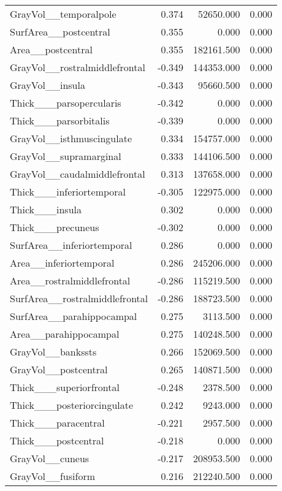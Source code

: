\documentclass{article}
\begin{document}
\begin{table}
\begin{tabular}{lrrr}
	GrayVol\_\_temporalpole & 0.374 & 52650.000 & 0.000 \\
	SurfArea\_\_postcentral & 0.355 & 0.000 & 0.000 \\
	Area\_\_postcentral & 0.355 & 182161.500 & 0.000 \\
	GrayVol\_\_rostralmiddlefrontal & -0.349 & 144353.000 & 0.000 \\
	GrayVol\_\_insula & -0.343 & 95660.500 & 0.000 \\
	Thick\_\_\_parsopercularis & -0.342 & 0.000 & 0.000 \\
	Thick\_\_\_parsorbitalis & -0.339 & 0.000 & 0.000 \\
	GrayVol\_\_isthmuscingulate & 0.334 & 154757.000 & 0.000 \\
	GrayVol\_\_supramarginal & 0.333 & 144106.500 & 0.000 \\
	GrayVol\_\_caudalmiddlefrontal & 0.313 & 137658.000 & 0.000 \\
	Thick\_\_\_inferiortemporal & -0.305 & 122975.000 & 0.000 \\
	Thick\_\_\_insula & 0.302 & 0.000 & 0.000 \\
	Thick\_\_\_precuneus & -0.302 & 0.000 & 0.000 \\
	SurfArea\_\_inferiortemporal & 0.286 & 0.000 & 0.000 \\
	Area\_\_inferiortemporal & 0.286 & 245206.000 & 0.000 \\
	Area\_\_rostralmiddlefrontal & -0.286 & 115219.500 & 0.000 \\
	SurfArea\_\_rostralmiddlefrontal & -0.286 & 188723.500 & 0.000 \\
	SurfArea\_\_parahippocampal & 0.275 & 3113.500 & 0.000 \\
	Area\_\_parahippocampal & 0.275 & 140248.500 & 0.000 \\
	GrayVol\_\_bankssts & 0.266 & 152069.500 & 0.000 \\
	GrayVol\_\_postcentral & 0.265 & 140871.500 & 0.000 \\
	Thick\_\_\_superiorfrontal & -0.248 & 2378.500 & 0.000 \\
	Thick\_\_\_posteriorcingulate & 0.242 & 9243.000 & 0.000 \\
	Thick\_\_\_paracentral & -0.221 & 2957.500 & 0.000 \\
	Thick\_\_\_postcentral & -0.218 & 0.000 & 0.000 \\
	GrayVol\_\_cuneus & -0.217 & 208953.500 & 0.000 \\
	GrayVol\_\_fusiform & 0.216 & 212240.500 & 0.000 \\

\end{tabular}
\end{table}
\end{document}
